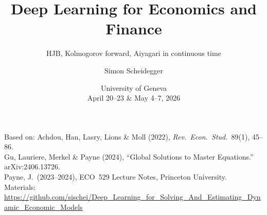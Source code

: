 \documentclass[aspectratio=169,11pt]{beamer}
\title[Deep Learning -- Geneva 2026]%
{Deep Learning for Economics and Finance}
\subtitle{HJB, Kolmogorov forward, Aiyagari in continuous time}
\author{Simon Scheidegger}
\institute[HEC Lausanne]{HEC, University of Lausanne}
\date{University of Geneva\\April 20--23 \& May 4--7, 2026}
\begin{document}
\newcommand{\exercisepause}{%
  \tikz[baseline=(X.base)]{\node[fill=darkgreen!80!black, text=white,
  rounded corners=2pt, inner sep=3pt, font=\scriptsize\bfseries](X){PAUSE --- 5 min};}}



{
\begin{frame}
\titlepage
\vspace{-0.4cm}
\begin{center}
{\footnotesize Based on: Achdou, Han, Lasry, Lions \& Moll (2022), \emph{Rev.\ Econ.\ Stud.}\ 89(1), 45--86.}\\[2pt]
{\footnotesize Gu, Lauriere, Merkel \& Payne (2024), ``Global Solutions to Master Equations.'' arXiv:2406.13726.}\\[2pt]
{\footnotesize Payne, J.\ (2023--2024), ECO~529 Lecture Notes, Princeton University.}\\[4pt]
{\footnotesize Materials: \url{https://github.com/sischei/Deep_Learning_for_Solving_And_Estimating_Dynamic_Economic_Models}}
\end{center}
\end{frame}
}
\end{document}
